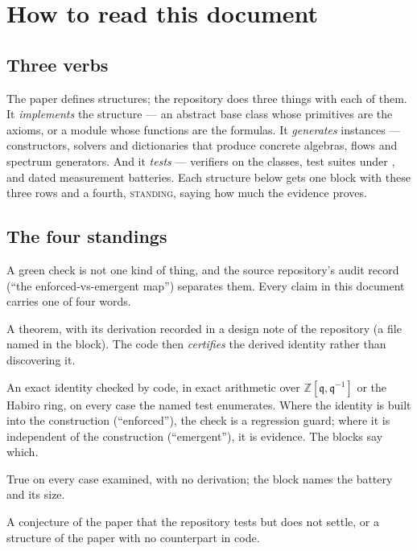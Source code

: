\documentclass[11pt]{amsart}
\newcommand\fq{\mathfrak{q}}
\newcommand\bZ{\mathbb{Z}}
\theoremstyle{remark}
\newcommand{\DERIVED}{\textsc{derived}}
\newcommand{\CERTIFIED}{\textsc{certified}}
\newcommand{\MEASURED}{\textsc{measured}}
\newcommand{\OPEN}{\textsc{open}}
\begin{document}
\section{How to read this document}

\subsection{Three verbs}
The paper defines structures; the repository does three things with each
of them.  It \emph{implements} the structure --- an abstract base class
whose primitives are the axioms, or a module whose functions are the
formulas.  It \emph{generates} instances --- constructors, solvers and
dictionaries that produce concrete algebras, flows and spectrum
generators.  And it \emph{tests} --- verifiers on the classes, test
suites under , and dated measurement batteries.  Each
structure below gets one block with these three rows and a fourth,
\textsc{standing}, saying how much the evidence proves.

\subsection{The four standings}
A green check is not one kind of thing, and the source repository's
audit record (``the enforced-vs-emergent map'') separates them.
Every claim in this document carries one of four words.
\begin{description}[leftmargin=2.6cm,style=nextline]
  \item[\DERIVED] A theorem, with its derivation recorded in a design note
    of the repository (a file named in the block).  The code then
    \emph{certifies} the derived identity rather than discovering it.
  \item[\CERTIFIED] An exact identity checked by code, in exact arithmetic
    over $\bZ[\fq,\fq^{-1}]$ or the Habiro ring, on every case the named
    test enumerates.  Where the identity is built into the construction
    (``enforced''), the check is a regression guard; where it is
    independent of the construction (``emergent''), it is evidence.  The
    blocks say which.
  \item[\MEASURED] True on every case examined, with no derivation; the
    block names the battery and its size.
  \item[\OPEN] A conjecture of the paper that the repository tests but does
    not settle, or a structure of the paper with no counterpart in code.
\end{description}
\end{document}
